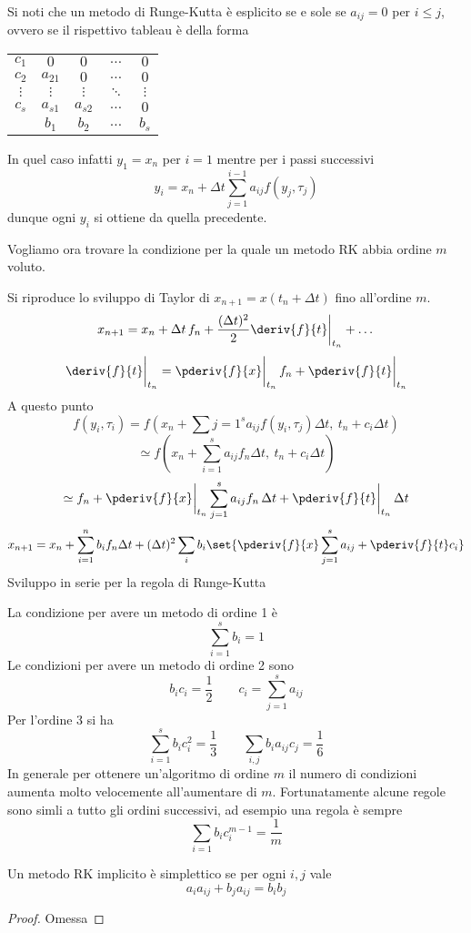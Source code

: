 \begin{remark}
Si noti che un metodo di Runge-Kutta è esplicito se e sole se $a_{ij} = 0$ per $i \le j$, ovvero se il rispettivo tableau è della forma
\begin{center}
\begin{tabular}{c|cccc}
$c_1$ & $0$ & $0$ & $\dots$ & $0$ \\
$c_2$ & $a_{21}$ & $0$ & $\dots$ & $0$ \\
$\vdots$ & $\vdots$  & $\vdots$ & $\ddots$ & $\vdots$ \\
$c_s$ & $a_{s1}$ & $a_{s2}$ & $\dots$ & $0$ \\
\midrule
      & $b_1$ & $b_2$ & $\dots$ & $b_s$ \\
\end{tabular}
\end{center}
In quel caso infatti $y_1 = x_n$ per $i = 1$ mentre per i passi successivi
\[
y_i = x_n + \Delta t \sum_{j = 1}^{i-1} a_{ij} f(y_j, \tau_j)
\]
dunque ogni $y_i$ si ottiene da quella precedente.
\end{remark}


Vogliamo ora trovare la condizione per la quale un metodo RK abbia ordine $m$ voluto.

Si riproduce lo sviluppo di Taylor di $x_{n+1} = x(t_n + \Delta t)$ fino all'ordine $m$.
\[
x_{n+1} = x_n + \Delta t \, f_n + \frac{(\Delta t)^2}{2} \deriv{f}{t} \bigg|_{t_n} + \dots
\]
\[
\deriv{f}{t} \bigg|_{t_n} = \pderiv{f}{x} \bigg|_{t_n} \, f_n + \pderiv{f}{t} \bigg|_{t_n}
\]
A questo punto
\[
f(y_i, \tau_i) = f\left(x_n + \sum{j = 1}^s a_{ij} f(y_i, \tau_j) \Delta t , \ t_n + c_i \Delta t \right)
\]
\[
\simeq f\left(x_n + \sum_{i = 1}^s a_{ij} f_n \Delta t , \ t_n + c_i \Delta t \right)
\]
\[
\simeq f_n + \pderiv{f}{x} \bigg|_{t_n} \sum_{j = 1}^s a_{ij} f_n \, \Delta t + \pderiv{f}{t} \bigg|_{t_n} \, \Delta t
\]
\[
x_{n+1} = x_n + \sum_{i = 1}^n b_i f_n \Delta t + (\Delta t)^2 \sum_i b_i \set{\pderiv{f}{x} \sum_{j = 1}^s a_{ij} + \pderiv{f}{t} c_i}
\]
Sviluppo in serie per la regola di Runge-Kutta

La condizione per avere un metodo di ordine 1  è
\[
\sum_{i = 1}^s b_i = 1
\]
Le condizioni per avere un metodo di ordine 2 sono
\[
b_i c_i = \frac{1}{2} \qquad c_i = \sum_{j = 1}^s a_{ij}
\]
Per l'ordine 3 si ha
\[
\sum_{i = 1}^s b_i c_i^2 = \frac{1}{3} \qquad \sum_{i,j} b_i a_{ij} c_j = \frac{1}{6}
\]
In generale per ottenere un'algoritmo di ordine $m$ il numero di condizioni aumenta molto velocemente all'aumentare di $m$. Fortunatamente alcune regole sono simli a tutto gli ordini successivi, ad esempio una regola è sempre
\[
\sum_{i = 1} b_i c^{m-1}_i = \frac{1}{m}
\]

\begin{proposition}
Un metodo $\mathrm{RK}$ implicito è simplettico se per ogni $i,j$ vale
\[
a_i a_{ij} + b_j a_{ij} = b_i b_j
\]
\end{proposition}
\begin{proof}
Omessa
\end{proof}